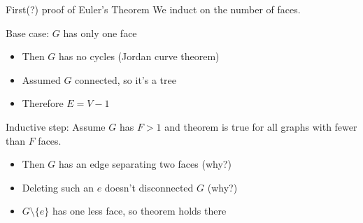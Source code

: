 \documentclass{beamer}
\begin{document}
\begin{frame}{First(?) proof of Euler's Theorem}
  We induct on the number of faces.

  \begin{block}{Base case: $G$ has only one face}
    \begin{itemize}
    \item Then $G$ has no cycles (Jordan curve theorem)
    \item Assumed $G$ connected, so it's a tree
    \item Therefore $E=V-1$
    \end{itemize}
    \end{block}

  \begin{block}{Inductive step:}
    Assume $G$ has $F>1$ and theorem is true for all graphs with fewer than $F$ faces.
    \begin{itemize}
    \item Then $G$ has an edge separating two faces (why?)
    \item Deleting such an $e$ doesn't disconnected $G$ (why?)
    \item $G\setminus \{e\}$ has one less face, so theorem holds there
      \end{itemize}
       \end{block}

\end{frame}
  
\end{document}
